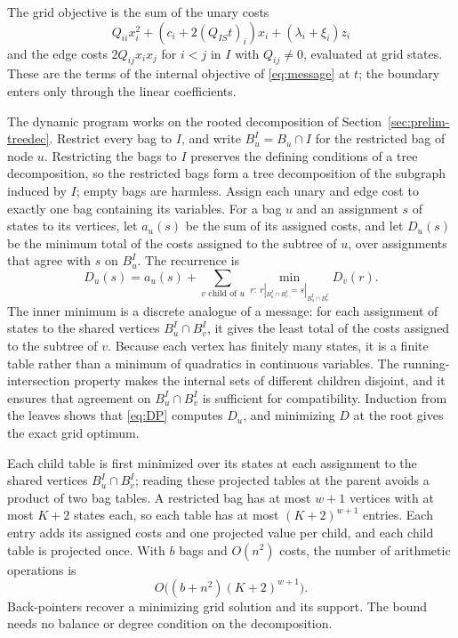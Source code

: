 The grid objective is the sum of the unary costs
\[
 Q_{ii}x_i^2+(c_i+2(Q_{IS}t)_i)x_i+(\lambda_i+\xi_i)z_i
\]
and the edge costs $2Q_{ij}x_ix_j$ for $i<j$ in $I$ with $Q_{ij}\ne0$,
evaluated at grid states. These are the terms of the internal objective
of \eqref{eq:message} at $t$; the boundary enters only through the linear
coefficients.

The dynamic program works on the rooted decomposition of
Section~\ref{sec:prelim-treedec}. Restrict every bag to $I$, and write
$B_u^I=B_u\cap I$ for the restricted bag of node $u$. Restricting the
bags to $I$ preserves the defining conditions of a tree decomposition,
so the restricted bags form a tree decomposition of the subgraph induced
by $I$; empty bags are harmless. Assign each unary and edge cost to
exactly one bag containing its variables. For a bag $u$ and an
assignment $s$ of states to its vertices, let $a_u(s)$ be the sum of its
assigned costs, and let $D_u(s)$ be the minimum total of the costs
assigned to the subtree of $u$, over assignments that agree with $s$ on
$B_u^I$. The recurrence is
\begin{equation}\label{eq:DP}
 D_u(s)=a_u(s)+\sum_{v\text{ child of }u}
       \min_{r:\ r|_{B_u^I\cap B_v^I}=s|_{B_u^I\cap B_v^I}}D_v(r).
\end{equation}
The inner minimum is a discrete analogue of a message: for each
assignment of states to the shared vertices $B_u^I\cap B_v^I$, it gives
the least total of the costs assigned to the subtree of $v$. Because each
vertex has finitely many states, it is a finite table rather than a
minimum of quadratics in continuous variables. The running-intersection
property makes the internal sets of different children disjoint, and
it ensures that agreement on $B_u^I\cap B_v^I$ is sufficient for
compatibility. Induction from the leaves shows that \eqref{eq:DP}
computes $D_u$, and minimizing $D$ at the root gives the exact grid
optimum.

Each child table is first minimized over its states at each assignment
to the shared vertices $B_u^I\cap B_v^I$; reading these projected tables
at the parent avoids a product of two bag tables. A restricted bag has at
most $w+1$ vertices with at most $K+2$ states each, so each table has at
most $(K+2)^{w+1}$ entries. Each entry adds its assigned costs and one
projected value per child, and each child table is projected once. With
$b$ bags and $O(n^2)$ costs, the number of arithmetic operations is
\begin{equation}\label{eq:DPcost}
 O\bigl((b+n^2)(K+2)^{w+1}\bigr).
\end{equation}
Back-pointers recover a minimizing grid solution and its support. The
bound needs no balance or degree condition on the decomposition.

